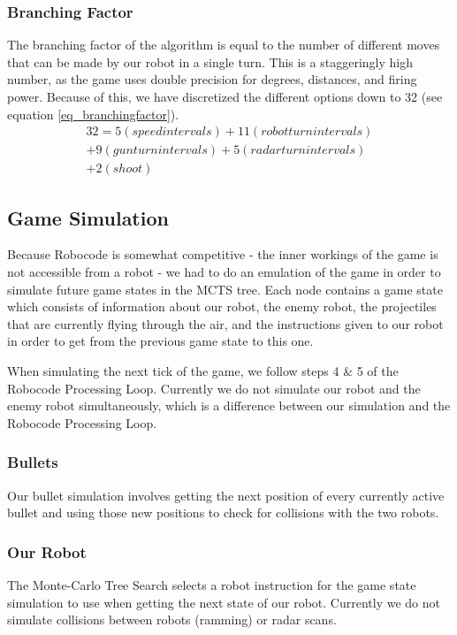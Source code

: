 \subsubsection{Branching Factor}
The branching factor of the algorithm is equal to the number of different moves that can be made by our robot in a single turn. This is a staggeringly high number, as the game uses double precision for degrees, distances, and firing power. Because of this, we have discretized the different options down to 32 (see equation \ref{eq_branchingfactor}).
\begin{equation}
\begin{split}
\label{eq_branchingfactor}
32 = 5 (speed intervals) + 11 (robot turn intervals)\\
+9 (gun turn intervals) + 5 (radar turn intervals) 
\\+ 2 (shoot)
\end{split}
\end{equation}
\subsection{Game Simulation}
Because Robocode is somewhat competitive - the inner workings of the game is not accessible from a robot - we had to do an emulation of the game in order to simulate future game states in the MCTS tree. Each node contains a game state which consists of information about our robot, the enemy robot, the projectiles that are currently flying through the air, and the instructions given to our robot in order to get from the previous game state to this one.

When simulating the next tick of the game, we follow steps 4 \& 5 of the Robocode Processing Loop\cite{wiki:robocodeGamePhysics}. Currently we do not simulate our robot and the enemy robot simultaneously, which is a difference between our simulation and the Robocode Processing Loop.
\subsubsection{Bullets} 
Our bullet simulation involves getting the next position of every currently active bullet and using those new positions to check for collisions with the two robots.
\subsubsection{Our Robot}
The Monte-Carlo Tree Search selects a robot instruction for the game state simulation to use when getting the next state of our robot. Currently we do not simulate collisions between robots (ramming) or radar scans.
